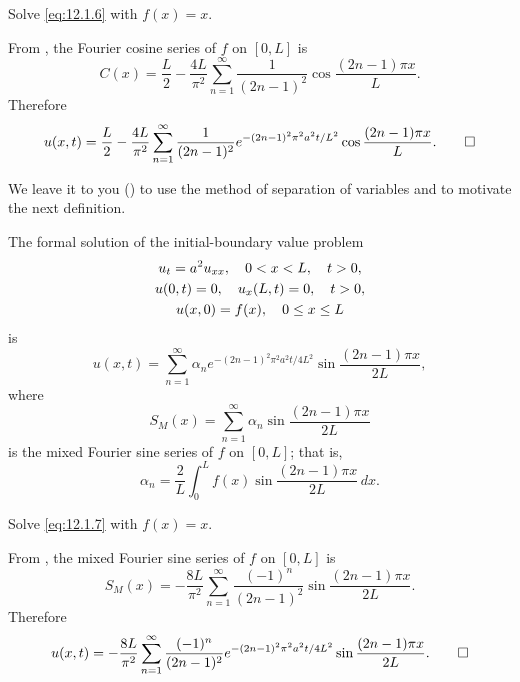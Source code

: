 \begin{example}\label{example:12.1.2}
Solve \eqref{eq:12.1.6} with $f(x)=x$.
\end{example}

\begin{solution}
From  , the Fourier
cosine series of
$f$ on $[0,L]$ is
\[
C(x)=\frac{L}{2}-\frac{4L}{\pi^2}\sum_{n=1}^\infty\frac{1}{(2n-1)^2}
\cos\frac{(2n-1)\pi x}{L}.
\]
Therefore
\[
u(x,t)=\frac{L}{2}-\frac{4L}{\pi^2}\sum_{n=1}^\infty
\frac{1}{(2n-1)^2}
e^{-(2n-1)^2\pi^2a^2t/L^2}\cos\frac{(2n-1)\pi x}{L}.
\qedhere
\]
\end{solution}

 We  leave it to you ()
to use the method of separation of variables and 
to motivate the next definition.

\begin{definition}\label{thmtype:12.1.4}
The formal solution of the initial-boundary value problem
\begin{gather}
u_t=a^2u_{xx},\quad 0<x<L,\quad t>0, \notag\\
u(0,t)=0,\quad u_x(L,t)=0,\quad t>0,\label{eq:12.1.7}\\
u(x,0)=f(x),\quad 0\le x\le L\notag
\end{gather}
is
\[
u(x,t)=\sum_{n=1}^\infty \alpha_ne^{-(2n-1)^2\pi^2a^2t/4L^2}\sin\frac{(2n-1)\pi
x}{2L},
\]
where
\[
S_M(x)=\sum_{n=1}^\infty \alpha_n\sin\frac{(2n-1)\pi x}{2L}
\]
is the mixed Fourier sine series of $f$ on $[0,L]$; that is,
\[
\alpha_n=\frac{2}{L}\int_0^Lf(x)\sin\frac{(2n-1)\pi x}{2L}\,dx.
\]
\end{definition}



\begin{example}\label{example:12.1.3}
Solve \eqref{eq:12.1.7} with $f(x)=x$.
\end{example}


\begin{solution}
From  , the mixed
Fourier sine series of
$f$ on $[0,L]$ is
\[
S_M(x)=-\frac{8L}{\pi^2}\sum_{n=1}^\infty\frac{(-1)^n}{(2n-1)^2}
\sin\frac{(2n-1)\pi x}{2L}.
\]
Therefore
\[
u(x,t)=-\frac{8L}{\pi^2}\sum_{n=1}^\infty\frac{(-1)^n}{(2n-1)^2}
e^{-(2n-1)^2\pi^2a^2t/4L^2}\sin\frac{(2n-1)\pi x}{2L}.
\qedhere
\]
\end{solution}

